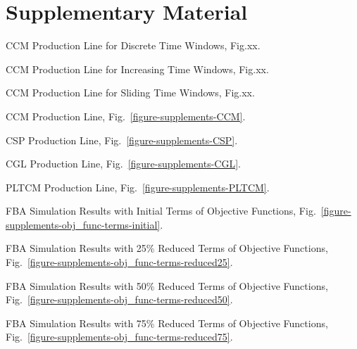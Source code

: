 \chapter{Supplementary Material}
\captionsetup{list=no}
\begin{itemize}
	{\color{red}
	\item CCM Production Line for Discrete Time Windows, Fig.xx.
	\item CCM Production Line for Increasing Time Windows, Fig.xx.
	\item CCM Production Line for Sliding Time Windows, Fig.xx.}
	\item CCM Production Line, Fig.~\ref{figure-supplements-CCM}.
	\item CSP Production Line, Fig.~\ref{figure-supplements-CSP}.
	\item CGL Production Line, Fig.~\ref{figure-supplements-CGL}.
	\item PLTCM Production Line, Fig.~\ref{figure-supplements-PLTCM}.
	
	\item FBA Simulation Results with Initial Terms of Objective Functions, Fig.~\ref{figure-supplements-obj_func-terms-initial}.
	\item FBA Simulation Results with 25\% Reduced Terms of Objective Functions, Fig.~\ref{figure-supplements-obj_func-terms-reduced25}.
	\item FBA Simulation Results with 50\% Reduced Terms of Objective Functions, Fig.~\ref{figure-supplements-obj_func-terms-reduced50}.
	\item FBA Simulation Results with 75\% Reduced Terms of Objective Functions, Fig.~\ref{figure-supplements-obj_func-terms-reduced75}.
\end{itemize}
\clearpage

\beginsupplement











